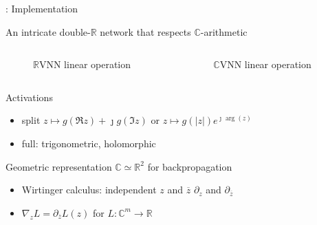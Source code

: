 \documentclass{beamer}
\newcommand{\real}{\mathbb{R}}
\newcommand{\cplx}{\mathbb{C}}
\newcommand{\conj}[1]{\overline{#1}}
\newcommand{\iu}{{\jmath}}
\begin{document}
\begin{frame}[c]{\insertsection: Implementation}

  An intricate double-$\real$ network that respects $\cplx$-arithmetic
  \vspace{-1em}
  \begin{columns}[T]
    \begin{column}{0.45\linewidth}
      \begin{figure}
          
        {$\real$VNN linear operation}
      \end{figure}
    \end{column}%
    \begin{column}{0.45\linewidth}
      \begin{figure}
          
        {$\cplx$VNN linear operation}
      \end{figure}
    \end{column}
  \end{columns}

  \bigskip
  Activations
  \begin{itemize}
    \item split $
      z \mapsto g(\Re{z}) + \iu g(\Im{z}) %
    $ or $
      z \mapsto g(\lvert z\rvert) e^{\iu \arg{\!(z)}}
    $ %
    \item full: trigonometric, holomorphic
  \end{itemize}

  \smallskip
  Geometric representation $\cplx \simeq \real^2$ for backpropagation
  \begin{itemize}
    \item Wirtinger calculus: independent $z$ and ${\conj{z}}$ $
        \partial_z
      $ and $
        \partial_{\conj{z}}
      $
    \item $\nabla_z L = \partial_{\conj{z}} L(z)$ for $L\colon \cplx^m \to \real$
  \end{itemize}
\end{frame}
\end{document}
